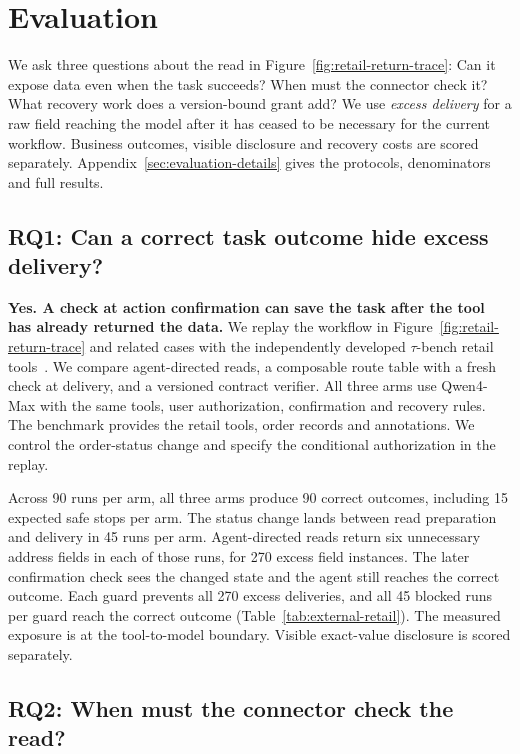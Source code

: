 \section{Evaluation}

We ask three questions about the read in Figure~\ref{fig:retail-return-trace}: Can it expose data even when the task succeeds? When must the connector check it? What recovery work does a version-bound grant add? We use \emph{excess delivery} for a raw field reaching the model after it has ceased to be necessary for the current workflow. Business outcomes, visible disclosure and recovery costs are scored separately. Appendix~\ref{sec:evaluation-details} gives the protocols, denominators and full results.

\subsection{RQ1: Can a correct task outcome hide excess delivery?}
\label{sec:rq-exposure}

\textbf{Yes. A check at action confirmation can save the task after the tool has already returned the data.}
We replay the workflow in Figure~\ref{fig:retail-return-trace} and related cases with the independently developed $\tau$-bench retail tools~\cite{taubench}. We compare agent-directed reads, a composable route table with a fresh check at delivery, and a versioned contract verifier. All three arms use Qwen4-Max with the same tools, user authorization, confirmation and recovery rules. The benchmark provides the retail tools, order records and annotations. We control the order-status change and specify the conditional authorization in the replay.

Across 90 runs per arm, all three arms produce 90 correct outcomes, including 15 expected safe stops per arm. The status change lands between read preparation and delivery in 45 runs per arm. Agent-directed reads return six unnecessary address fields in each of those runs, for 270 excess field instances. The later confirmation check sees the changed state and the agent still reaches the correct outcome. Each guard prevents all 270 excess deliveries, and all 45 blocked runs per guard reach the correct outcome (Table~\ref{tab:external-retail}). The measured exposure is at the tool-to-model boundary. Visible exact-value disclosure is scored separately.

\subsection{RQ2: When must the connector check the read?}
\label{sec:rq-timing}

